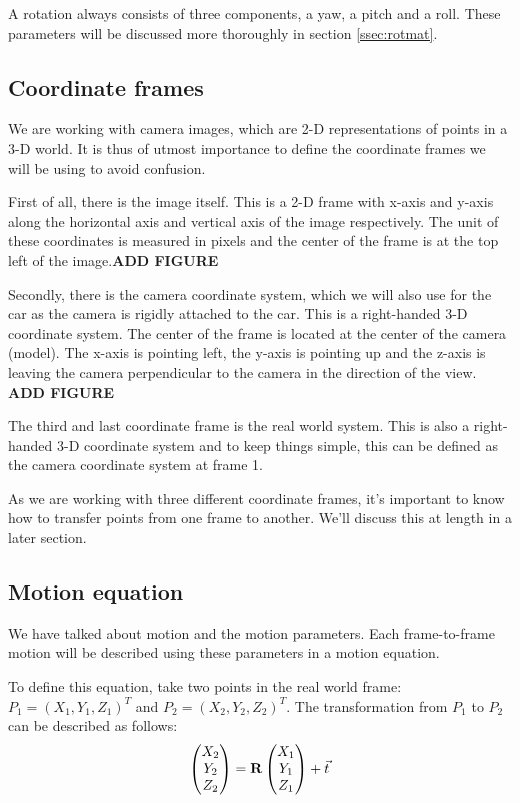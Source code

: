 A rotation always consists of three components, a yaw, a pitch and a roll. These parameters will be discussed more thoroughly in section \autoref{ssec:rotmat}.

\subsection{Coordinate frames}
We are working with camera images, which are 2-D representations of points in a 3-D world. It is thus of utmost importance to define the coordinate frames we will be using to avoid confusion.\bigskip

First of all, there is the image itself. This is a 2-D frame with x-axis and y-axis along the horizontal axis and vertical axis of the image respectively. The unit of these coordinates is measured in pixels and the center of the frame is at the top left of the image.\textbf{ADD FIGURE}\bigskip

Secondly, there is the camera coordinate system, which we will also use for the car as the camera is rigidly attached to the car. This is a right-handed 3-D coordinate system. The center of the frame is located at the center of the camera (model). The x-axis is pointing left, the y-axis is pointing up and the z-axis is leaving the camera perpendicular to the camera in the direction of the view. \textbf{ADD FIGURE}\bigskip

The third and last coordinate frame is the real world system. This is also a right-handed 3-D coordinate system and to keep things simple, this can be defined as the camera coordinate system at frame 1.\bigskip

As we are working with three different coordinate frames, it's important to know how to transfer points from one frame to another. We'll discuss this at length in a later section.

\subsection{Motion equation}
We have talked about motion and the motion parameters. Each frame-to-frame motion will be described using these parameters in a motion equation.\bigskip

To define this equation, take two points in the real world frame: $P_1 = (X_1, Y_1, Z_1)^T$ and $P_2 = (X_2, Y_2, Z_2)^T$. The transformation from $P_1$ to $P_2$ can be described as follows:
\begin{equation}\label{eq:motion}
    \begin{pmatrix}
        X_2 \\ Y_2 \\ Z_2
    \end{pmatrix} =  \mathbf{R} \begin{pmatrix}
        X_1 \\ Y_1 \\ Z_1
    \end{pmatrix}+ \vec t
\end{equation}

